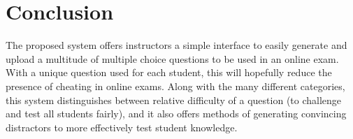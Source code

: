 \documentclass{article}
\begin{document}
\section{Conclusion} \label{sec-conclusion}

The proposed system offers instructors a simple interface to easily generate and upload a multitude of multiple choice questions to be used in an online exam. With a unique question used for each student, this will hopefully reduce the presence of cheating in online exams. Along with the many different categories, this system distinguishes between relative difficulty of a question (to challenge and test all students fairly), and it also offers methods of generating convincing distractors to more effectively test student knowledge. 
\end{document}
